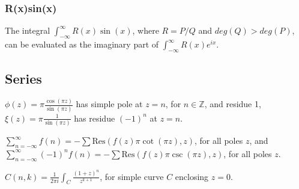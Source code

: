 \documentclass[12pt, a4paper]{article}
\theoremstyle{definition}
\theoremstyle{remark}
\newcommand{\bb}[1]{\mathbb{#1}}
\newcommand{\res}{\text{Res}}
\begin{document}
\subsubsection{R(x)sin(x)}

The integral $\int_{-\infty}^{\infty} R(x) \sin(x)$, where $R = P/Q$ and $deg(Q)> deg(P)$, can be evaluated as the imaginary part of $\int_{-\infty}^{\infty} R(x) e^{ix}$.

\subsection{Series}

$\phi(z) = \pi \frac{\cos(\pi z)}{\sin(\pi z)}$ has simple pole at $z = n$, for $n \in \bb{Z}$, and residue 1, $\xi(z) = \pi \frac{1}{\sin(\pi z)}$ has residue $(-1)^n$ at $z = n$.

$\sum_{n=-\infty}^{\infty} f(n) = - \sum \res(f(z)\pi \cot(\pi z), z)$, for all poles $z$,
and $\sum_{n=-\infty}^{\infty} (-1)^n f(n) = - \sum \res(f(z)\pi \csc(\pi z), z)$, for all poles $z$.

$C(n,k) = \frac{1}{2\pi i } \int_{C} \frac{(1+z)^n}{z^{k+1}}$, for simple curve $C$ enclosing $z = 0$.

\end{document}
